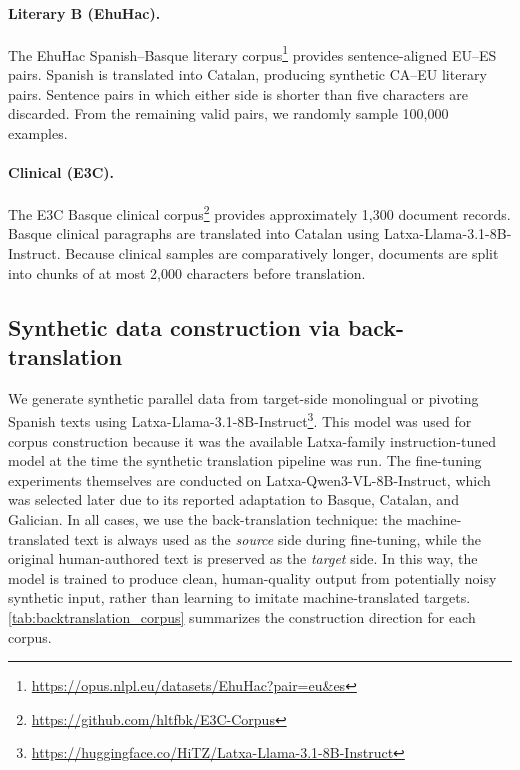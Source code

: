 \documentclass[11pt,a4paper]{article}
\begin{document}
\paragraph{Literary B (EhuHac).} The EhuHac Spanish--Basque literary
corpus\footnote{\url{https://opus.nlpl.eu/datasets/EhuHac?pair=eu&es}}
provides sentence-aligned EU--ES pairs. Spanish is translated into
Catalan, producing synthetic CA--EU literary pairs. Sentence pairs in
which either side is shorter than five characters are discarded. From
the remaining valid pairs, we randomly sample 100,000 examples.

\paragraph{Clinical (E3C).} The E3C Basque clinical corpus\footnote{\url{https://github.com/hltfbk/E3C-Corpus}}
provides approximately 1,300 document records. Basque clinical paragraphs are
translated into Catalan using Latxa-Llama-3.1-8B-Instruct. Because clinical
samples are comparatively longer, documents are split into chunks of at
most 2,000 characters before translation.

\subsection{Synthetic data construction via back-translation}

We generate synthetic parallel data from
target-side monolingual or pivoting Spanish texts using Latxa-Llama-3.1-8B-Instruct\footnote{\url{https://huggingface.co/HiTZ/Latxa-Llama-3.1-8B-Instruct}}. This model was used for corpus construction because it was the available
Latxa-family instruction-tuned model at the time the synthetic
translation pipeline was run. The fine-tuning experiments themselves are
conducted on Latxa-Qwen3-VL-8B-Instruct, which was selected later due to
its reported adaptation to Basque, Catalan, and Galician. In all cases, we use the back-translation technique: the machine-translated text is always used as the \emph{source} side during fine-tuning, while the original human-authored text is preserved as the \emph{target} side. In this way, the model is trained to produce clean, human-quality output from potentially noisy synthetic input, rather than learning to imitate machine-translated targets. \autoref{tab:backtranslation_corpus} summarizes the construction direction for each corpus.
\end{document}
